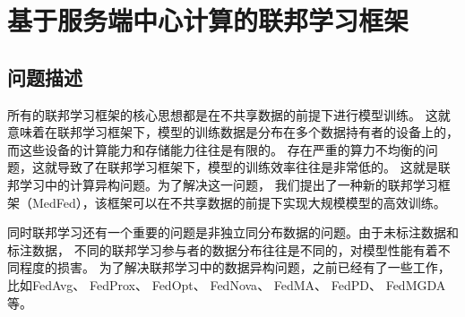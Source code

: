 \chapter{基于服务端中心计算的联邦学习框架}

\section{问题描述}

所有的联邦学习框架的核心思想都是在不共享数据的前提下进行模型训练。
这就意味着在联邦学习框架下，模型的训练数据是分布在多个数据持有者的设备上的，而这些设备的计算能力和存储能力往往是有限的。
存在严重的算力不均衡的问题，这就导致了在联邦学习框架下，模型的训练效率往往是非常低的。
这就是联邦学习中的计算异构问题。为了解决这一问题，
我们提出了一种新的联邦学习框架（MedFed），该框架可以在不共享数据的前提下实现大规模模型的高效训练。

同时联邦学习还有一个重要的问题是非独立同分布数据的问题。由于未标注数据和标注数据，
不同的联邦学习参与者的数据分布往往是不同的，对模型性能有着不同程度的损害。
为了解决联邦学习中的数据异构问题，之前已经有了一些工作，
比如FedAvg\supercite{DBLP:journals/corr/McMahanMRA16}、
FedProx\supercite{DBLP:journals/corr/abs-1812-06127}、
FedOpt\supercite{DBLP:journals/corr/abs-1910-12093}、
FedNova\supercite{DBLP:journals/corr/abs-2003-00295}、
FedMA\supercite{DBLP:journals/corr/abs-2007-13518}、
FedPD\supercite{DBLP:journals/corr/abs-2007-13518}、
FedMGDA\supercite{DBLP:journals/corr/abs-2007-13518}等。

